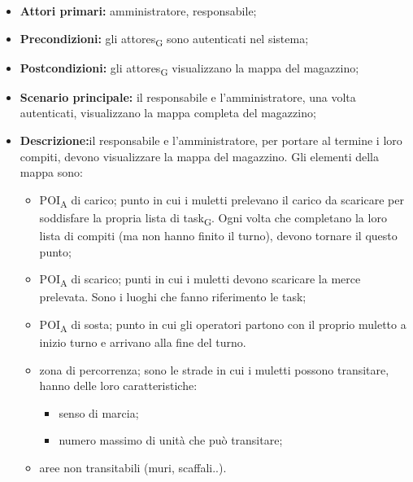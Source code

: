 \begin{itemize}
	\item 	\textbf{Attori primari:} amministratore, responsabile;
	\item 	\textbf{Precondizioni:} gli \glspl{attore}\textsubscript{G} sono autenticati nel sistema;
	\item 	\textbf{Postcondizioni:} gli \glspl{attore}\textsubscript{G} visualizzano la mappa del magazzino;
	\item 	\textbf{Scenario principale:} il responsabile e l’amministratore, una volta autenticati, visualizzano la mappa completa del magazzino;
	\item 	\textbf{Descrizione:}il responsabile e l’amministratore, per portare al termine i loro compiti, devono visualizzare la mappa del magazzino. Gli elementi della mappa sono:
	\begin{itemize}
		\item \acrshort{POI}\textsubscript{A} di carico;  punto in cui i muletti prelevano il carico da scaricare per soddisfare la propria lista di \gls{task}\textsubscript{G}. Ogni volta che completano la loro lista di compiti (ma non hanno finito il turno), devono tornare il questo punto;
		\item \acrshort{POI}\textsubscript{A} di scarico; punti in cui i muletti devono scaricare la merce prelevata. Sono i luoghi che fanno riferimento le task;
		\item \acrshort{POI}\textsubscript{A} di sosta; punto in cui gli operatori partono con il proprio muletto a inizio turno e arrivano alla fine del turno.
		\item zona di percorrenza; sono le strade in cui i muletti possono transitare, hanno delle loro caratteristiche:
		\begin{itemize}
			\item senso di marcia;
			\item numero massimo di unità che può transitare;
		\end{itemize}
		\item aree non transitabili (muri, scaffali..).
	\end{itemize}

\end{itemize}


